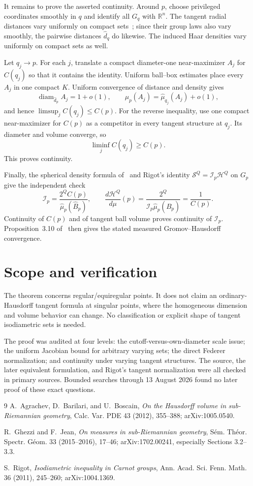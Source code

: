 \documentclass[11pt]{article}
\newcommand{\Hh}{\mathcal H}
\newcommand{\Ss}{\mathcal S}
\newcommand{\diam}{\operatorname{diam}}
\newcommand{\R}{\mathbb R}
\begin{document}
It remains to prove the asserted continuity.  Around $p$, choose privileged
coordinates smoothly in $q$ and identify all $G_q$ with $\R^n$.  The tangent
radial distances vary uniformly on compact sets~\cite{ABB}; since their group
laws also vary smoothly, the pairwise distances $\widehat d_q$ do likewise.
The induced Haar densities vary uniformly on compact sets as well.

Let $q_j\to p$.  For each $j$, translate a compact diameter-one
near-maximizer $A_j$ for $C(q_j)$ so that it contains the identity.  Uniform
ball--box estimates place every $A_j$ in one compact $K$.  Uniform convergence
of distance and density gives
\[
 \diam_{\widehat d_p}A_j=1+o(1),\qquad
 \widehat\mu_p(A_j)=\widehat\mu_{q_j}(A_j)+o(1),
\]
and hence $\limsup_jC(q_j)\leq C(p)$.  For the reverse inequality, use one
compact near-maximizer for $C(p)$ as a competitor in every tangent structure
at $q_j$.  Its diameter and volume converge, so
\[
 \liminf_j C(q_j)\geq C(p).
\]
This proves continuity.

Finally, the spherical density formula of~\cite{ABB} and Rigot's identity
$\Ss^Q=\mathscr I_p\Hh^Q$ on $G_p$ give the independent check
\[
 \mathscr I_p=\frac{2^Q C(p)}{\widehat\mu_p(\widehat B_p)},
 \qquad
 \frac{d\Hh^Q}{d\mu}(p)=
 \frac{2^Q}{\mathscr I_p\widehat\mu_p(\widehat B_p)}=\frac1{C(p)}.
\]
Continuity of $C(p)$ and of tangent ball volume proves continuity of
$\mathscr I_p$.  Proposition~3.10 of~\cite{GJ} then gives the stated measured
Gromov--Hausdorff convergence.

\section{Scope and verification}

The theorem concerns regular/equiregular points.  It does not claim an
ordinary-Hausdorff tangent formula at singular points, where the homogeneous
dimension and volume behavior can change.  No classification or explicit
shape of tangent isodiametric sets is needed.

The proof was audited at four levels: the cutoff-versus-own-diameter scale
issue; the uniform Jacobian bound for arbitrary varying sets; the direct
Federer normalization; and continuity under varying tangent structures.  The
source, the later equivalent formulation, and Rigot's tangent normalization
were all checked in primary sources.  Bounded searches through 13 August 2026
found no later proof of these exact questions.

\small
\begin{thebibliography}{9}
A.~Agrachev, D.~Barilari, and U.~Boscain,
\emph{On the Hausdorff volume in sub-Riemannian geometry},
Calc. Var. PDE 43 (2012), 355--388; arXiv:1005.0540.

R.~Ghezzi and F.~Jean,
\emph{On measures in sub-Riemannian geometry},
S\'em. Th\'eor. Spectr. G\'eom. 33 (2015--2016), 17--46;
arXiv:1702.00241, especially Sections 3.2--3.3.

S.~Rigot,
\emph{Isodiametric inequality in Carnot groups},
Ann. Acad. Sci. Fenn. Math. 36 (2011), 245--260; arXiv:1004.1369.
\end{thebibliography}
\end{document}
